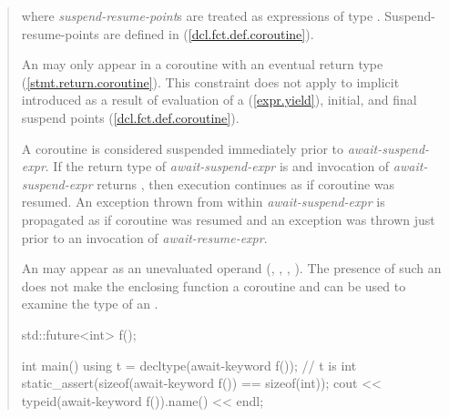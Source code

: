 \begin{quote}
%
%
%
%

where \textit{suspend-resume-point}s are treated as  expressions of type . Suspend-resume-points are defined in (\ref{dcl.fct.def.coroutine}).

\pnum
An  may only appear in a coroutine 
with an eventual return type (\ref{stmt.return.coroutine}). This constraint does not apply to implicit  introduced as a result of evaluation of a  (\ref{expr.yield}), initial, and final suspend points (\ref{dcl.fct.def.coroutine}).

\pnum
A coroutine is considered suspended immediately prior to  \textit{await-suspend-expr}. If the return type of \textit{await-suspend-expr} is  and invocation of \textit{await-suspend-expr} returns , then execution continues as if coroutine was resumed. An exception thrown from within \textit{await-suspend-expr} is propagated as if coroutine was resumed and an exception was thrown just prior to an invocation of \textit{await-resume-expr}.

\pnum
\enternote
An  may appear as an unevaluated operand (, , , ). The presence of such an  does not make the enclosing function a coroutine and can be used to examine the type of an .

\enterexample
\begin{codeblock}	
  std::future<int> f();
  
  int main() {
    using t = decltype(await-keyword f()); // t is int
    static_assert(sizeof(await-keyword f()) == sizeof(int));
    cout << typeid(await-keyword f()).name() << endl;
  }
\end{codeblock}
\exitexample%
\exitnote

\end{quote}
